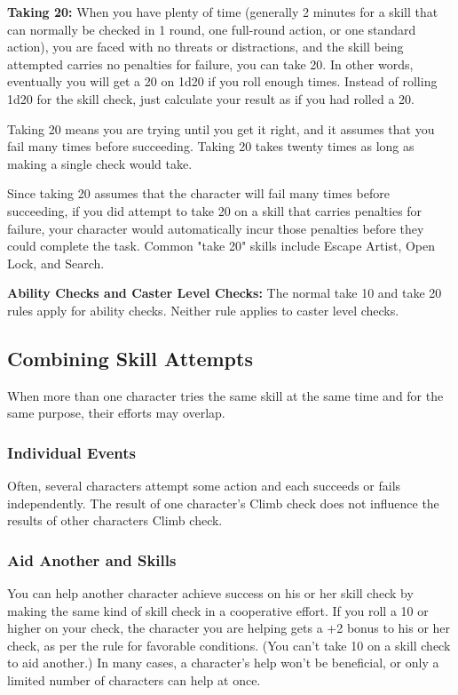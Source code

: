 \begin{multicols}{2}
\textbf{Taking 20:} When you have plenty of time (generally 2 minutes for a skill that can normally be checked in 1 round, one full-round action, or one standard action), you are faced with no threats or distractions, and the skill being attempted carries no penalties for failure, you can take 20. In other words, eventually you will get a 20 on 1d20 if you roll enough times. Instead of rolling 1d20 for the skill check, just calculate your result as if you had rolled a 20.

Taking 20 means you are trying until you get it right, and it assumes that you fail many times before succeeding. Taking 20 takes twenty times as long as making a single check would take.

Since taking 20 assumes that the character will fail many times before succeeding, if you did attempt to take 20 on a skill that carries penalties for failure, your character would automatically incur those penalties before they could complete the task. Common "take 20" skills include Escape Artist, Open Lock, and Search.

\textbf{Ability Checks and Caster Level Checks:} The normal take 10 and take 20 rules apply for ability checks. Neither rule applies to caster level checks.

\subsection{Combining Skill Attempts}

When more than one character tries the same skill at the same time and for the same purpose, their efforts may overlap.

\subsubsection{Individual Events}

Often, several characters attempt some action and each succeeds or fails independently. The result of one character's Climb check does not influence the results of other characters Climb check.

\subsubsection{Aid Another and Skills}

You can help another character achieve success on his or her skill check by making the same kind of skill check in a cooperative effort. If you roll a 10 or higher on your check, the character you are helping gets a +2 bonus to his or her check, as per the rule for favorable conditions. (You can't take 10 on a skill check to aid another.) In many cases, a character's help won't be beneficial, or only a limited number of characters can help at once. 


\end{multicols}
